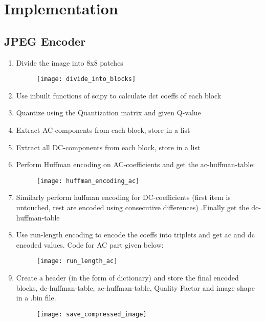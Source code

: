 \documentclass[12pt, a4paper]{report}
\begin{document}
	\chapter{Implementation}
	\section{JPEG Encoder}
	
	\begin{enumerate}
	\item Divide the image into 8x8 patches
		\begin{figure}[H]
			\centering
			\texttt{[image: divide\_into\_blocks]}
			\caption{}
			\label{fig:divideintoblocks}
		\end{figure}
	\item Use inbuilt functions of scipy to calculate dct coeffs of each block
	\item Quantize using the Quantization matrix and given Q-value
	\item Extract AC-components from each block, store in a list
	\item Extract all DC-components from each block, store in a list
	\item Perform Huffman encoding on AC-coefficients and get the ac-huffman-table:
	\begin{figure}[H]
		\centering
		\texttt{[image: huffman\_encoding\_ac]}
		\caption[ac_coeff huffman encoding]{}
		\label{fig:huffmanencodingac}
	\end{figure}
	\item Similarly perform huffman encoding for DC-coefficients (first item is untouched, rest are encoded using consecutive differences) .Finally get the dc-huffman-table
	
	\item Use run-length encoding to encode the coeffs into triplets and get ac and dc encoded values. Code for AC part given below:
\begin{figure}[H]
	\centering
	\texttt{[image: run\_length\_ac]}
	\caption[run length encoding for ac coefficients]{}
	\label{fig:runlengthac}
\end{figure}
	\item Create a header (in the form of dictionary) and store the final encoded blocks, dc-huffman-table, ac-huffman-table, Quality Factor and image shape in a .bin file.\begin{figure}[H]
		\centering
		\texttt{[image: save\_compressed\_image]}
		\caption[save the compressed file]{}
		\label{fig:savecompressedimage}
	\end{figure}
	
\end{enumerate}
	
\end{document}
